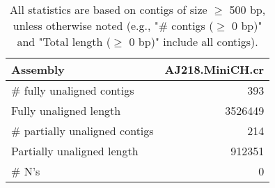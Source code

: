\documentclass[12pt,a4paper]{article}
\begin{document}
\begin{table}[ht]
\begin{center}
\caption{All statistics are based on contigs of size $\geq$ 500 bp, unless otherwise noted (e.g., "\# contigs ($\geq$ 0 bp)" and "Total length ($\geq$ 0 bp)" include all contigs).}
\begin{tabular}{|l*{1}{|r}|}
\hline
Assembly & AJ218.MiniCH.cr \\ \hline
\# fully unaligned contigs & 393 \\ \hline
Fully unaligned length & 3526449 \\ \hline
\# partially unaligned contigs & 214 \\ \hline
Partially unaligned length & 912351 \\ \hline
\# N's & 0 \\ \hline
\end{tabular}
\end{center}
\end{table}
\end{document}
